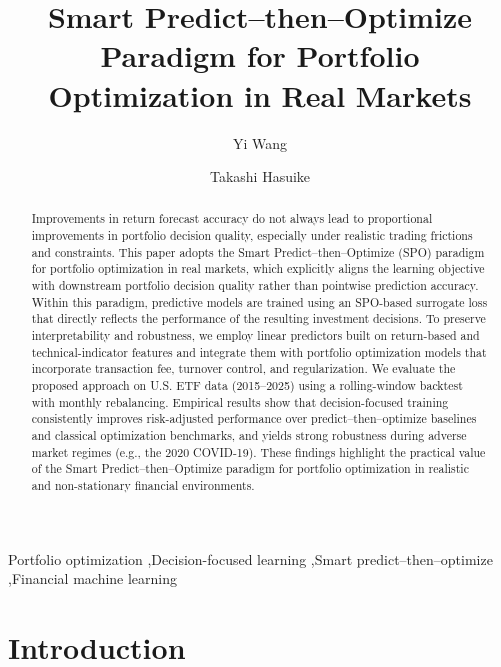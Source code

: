 \documentclass[review]{elsarticle}
\begin{document}
\begin{frontmatter}

\title{Smart Predict--then--Optimize Paradigm for Portfolio Optimization in Real Markets}

\author[inst1]{Yi Wang}

\author[inst1]{Takashi Hasuike}

\address[inst1]{Waseda University, Graduate School of Creative Science and Engineering, Tokyo, Japan}

\begin{abstract}
Improvements in return forecast accuracy do not always lead to proportional improvements in portfolio decision quality, especially under realistic trading frictions and constraints. This paper adopts
the Smart Predict--then--Optimize (SPO) paradigm for portfolio optimization in
real markets, which explicitly aligns the learning objective with downstream
portfolio decision quality rather than pointwise prediction accuracy. Within
this paradigm, predictive models are trained using an SPO-based surrogate loss
that directly reflects the performance of the resulting investment decisions. To preserve interpretability and robustness, we employ linear predictors built
on return-based and technical-indicator features and integrate them with
portfolio optimization models that incorporate transaction fee, turnover
control, and regularization. We evaluate the proposed approach on U.S. ETF data
(2015--2025) using a rolling-window backtest with monthly rebalancing. Empirical
results show that decision-focused training consistently improves risk-adjusted
performance over predict--then--optimize baselines and classical optimization
benchmarks, and yields strong robustness during adverse market regimes (e.g.,
the 2020 COVID-19). These findings highlight the practical value of the Smart
Predict--then--Optimize paradigm for portfolio optimization in realistic and
non-stationary financial environments.
\end{abstract}

\begin{keyword}
Portfolio optimization \sep Decision-focused learning \sep Smart predict--then--optimize \sep Financial machine learning
\end{keyword}

\end{frontmatter}

\section{Introduction}
\end{document}
